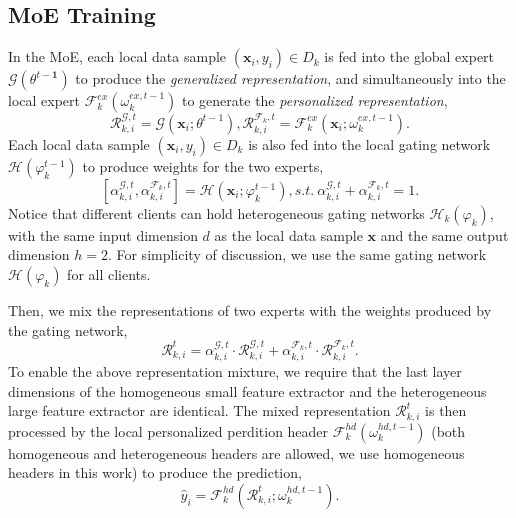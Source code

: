 \documentclass[sigconf]{acmart}
\newcommand{\hetero}{heterogeneous }
\newcommand{\homo}{homogeneous }
\newcommand{\pers}{personalized }
\newcommand{\gen}{generalized }
\newcommand{\rep}{representation }
\newcommand{\reps}{representations }
\begin{document}
\subsection{MoE Training}
In the MoE, each local data sample $(\boldsymbol{x}_i,y_i)\in D_k$ is fed into the global expert $\mathcal{G}(\theta^{{t}-\mathbf{1}})$ to produce the \textit{\gen representation}, and simultaneously into the local expert $\mathcal{F}_k^{ex}(\omega_k^{ex,t-1})$ to generate the \textit{\pers representation},
\begin{equation}
\boldsymbol{\mathcal{R}}_{k, i}^{\mathcal{G}, t}=\mathcal{G}(\boldsymbol{x}_i ; \theta^{t-1}), 
\boldsymbol{\mathcal{R}}_{k, i}^{\mathcal{F}_{k},t}=\mathcal{F}_k^{e x}(\boldsymbol{x}_i ; \omega_k^{e x, t-1}).
\end{equation}
Each local data sample $(\boldsymbol{x}_i,y_i)\in D_k$ is also fed into the local gating network $\mathcal{H}(\varphi_k^{t-1})$ to produce weights for the two experts,
\begin{equation}\label{eq:gating}
[\alpha_{k, i}^{\mathcal{G}, t}, \alpha_{k, i}^{\mathcal{F}_{k}, t}]=\mathcal{H}(\boldsymbol{x}_i ; \varphi_k^{t-1}), s.t. \ 
\alpha_{k, i}^{\mathcal{G}, t}+\alpha_{k, i}^{\mathcal{F}_{k}, t}=1.
\end{equation}
Notice that different clients can hold \hetero gating networks $\mathcal{H}_k(\varphi_k)$, with the same input dimension $d$ as the local data sample $\boldsymbol{x}$ and the same output dimension $h=2$. For simplicity of discussion, we use the same gating network $\mathcal{H}(\varphi_k)$ for all clients.

Then, we mix the \reps of two experts with the weights produced by the gating network,
\begin{equation}
\boldsymbol{\mathcal{R}}_{k, i}^t=\alpha_{k, i}^{\mathcal{G}, t} \cdot \boldsymbol{\mathcal{R}}_{k, i}^{\mathcal{G}, t}+\alpha_{k, i}^{\mathcal{F}_{k}, t} \cdot \boldsymbol{\mathcal{R}}_{k, i}^{\mathcal{F}_{k},t}.    
\end{equation}
To enable the above \rep mixture, we require that the last layer dimensions of the \homo small feature extractor and the \hetero large feature extractor are identical.
The mixed \rep $\boldsymbol{\mathcal{R}}_{k,i}^t$ is then processed by the local \pers perdition header $\mathcal{F}_k^{hd}(\omega_k^{hd,t-1})$ (both \homo and \hetero headers are allowed, we use \homo headers in this work) to produce the prediction,
\begin{equation}
\hat{y}_i=\mathcal{F}_k^{h d}(\boldsymbol{\mathcal{R}}_{k, i}^t ; \omega_k^{h d, t-1}).
\end{equation}
\end{document}
